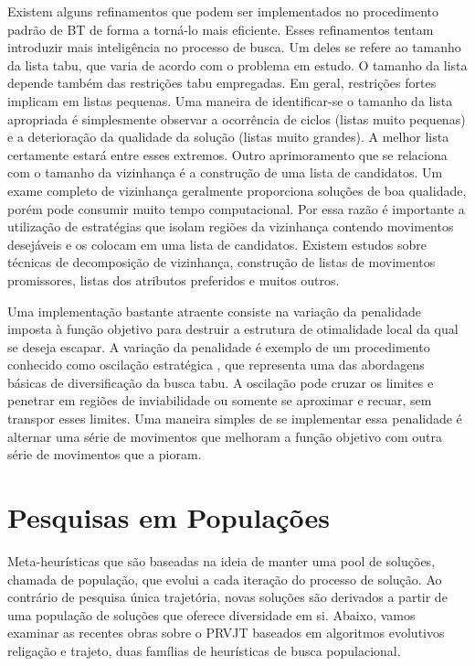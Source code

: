 Existem alguns refinamentos que podem ser implementados no procedimento padrão de BT de forma a torná-lo mais eficiente. Esses refinamentos tentam introduzir mais inteligência no processo de busca. Um deles se refere ao tamanho da lista tabu, que varia de acordo com o problema em estudo. O tamanho da lista depende também das restrições tabu empregadas. Em geral, restrições fortes implicam em listas pequenas. Uma maneira de identificar-se o tamanho da lista apropriada é simplesmente observar a ocorrência de ciclos (listas muito pequenas) e a deterioração da qualidade da solução (listas muito grandes). A melhor lista certamente estará entre esses extremos. Outro aprimoramento que se relaciona com o tamanho da vizinhança é a construção de uma lista de candidatos. Um exame completo de vizinhança geralmente proporciona soluções de boa qualidade, porém pode consumir muito tempo computacional. Por essa razão é importante a utilização de estratégias que isolam regiões da vizinhança contendo movimentos desejáveis e os colocam em uma lista de candidatos. Existem estudos sobre técnicas de decomposição de vizinhança, construção de listas de movimentos promissores, listas dos atributos preferidos e muitos outros. 


Uma implementação bastante atraente consiste na variação da penalidade imposta à função objetivo para destruir a estrutura de otimalidade local da qual se deseja escapar. A variação da penalidade é exemplo de um procedimento conhecido como oscilação estratégica , que representa uma das abordagens básicas de diversificação da busca tabu. A oscilação pode cruzar os limites e penetrar em regiões de inviabilidade ou somente se aproximar e recuar, sem transpor esses limites. Uma maneira simples de se implementar essa penalidade é alternar uma série de movimentos que melhoram a função objetivo com outra série de movimentos que a pioram. 
 

\section{Pesquisas em Populações}

Meta-heurísticas que são baseadas na ideia de manter uma pool de soluções, chamada de população, que evolui a cada iteração do processo de solução. Ao contrário de pesquisa única trajetória, novas soluções são derivados a partir de uma população de soluções que oferece diversidade em si. Abaixo, vamos examinar as recentes obras sobre o PRVJT baseados em algoritmos evolutivos religação e trajeto, duas famílias de heurísticas de busca populacional.
 

